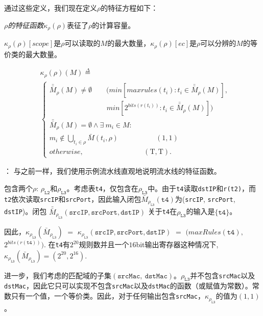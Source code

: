 通过这些定义，我们现在定义$\rho$的特征方程如下：
\begin{definition} {\em $\rho$的特征函数$\kappa_\rho(\rho)$}表征了$\rho$的计算容量。

$\kappa_\rho(\rho)[scope]$是$\rho$可以读取的$M$的最大数量，$\kappa_\rho(\rho)[ec]$是$\rho$可以分辨的$M$的等价类的最大数量。

\begin{equation*}
\begin{split}
&\kappa_\rho(\rho)(M) \overset{\Delta}{=}\\
&\begin{cases}
\bar{\bar{M}}_\rho(M) \neq \emptyset \quad \quad (min[maxrules(t_i) : t_i \in \bar{\bar{M}}_\rho(M)],\\
\quad \quad \quad \quad \quad \quad \quad \quad  min[2^{bits(r(t_i))} : t_i \in \bar{\bar{M}}_\rho(M)])\\
\bar{\bar{M}}_\rho(M) = \emptyset \wedge \exists\ m_i \in M :\\
m_i \notin \bigcup_{t_i \in \rho} \bar{M}(t_i, \rho)\  \quad \quad \quad \quad \quad (1, 1)\\
otherwise, \quad \quad \quad \quad \quad \quad \quad \ \ \ \ \, \, \,  (\mathrm{T}, \mathrm{T}). %
\end{cases}
\end{split}
\end{equation*}
\end{definition}

： 与之前一样，我们使用示例流水线\exampledp 直观地说明流水线的特征函数。

\exampledp{}包含两个$\rho$: $\rho_{\texttt{L2}}$和$\rho_{\texttt{L3}}$。考虑表\texttt{t4}，仅包含在$\rho_{\texttt{L3}}$中。由于\texttt{t4}读取\texttt{dstIP}和\texttt{r(t2)}，而\texttt{t2}依次读取\texttt{srcIP}和\texttt{srcPort}，因此输入闭包$\bar{M}_{\rho_{\texttt{L3}}}(\texttt{t4})$为(\texttt{srcIP}, \texttt{srcPort}, \texttt{dstIP})。闭包 $\bar{\bar{M}}_{\rho_\texttt{L3}}(\texttt{srcIP}, \texttt{srcPort}, \texttt{dstIP})$ 关于\texttt{t4}在$\rho_{\texttt{L3}}$的输入是$\{\texttt{t4}\}$。


因此，$\kappa_{\rho_{\texttt{L3}}}(\bar{M}_{\rho_{\texttt{L3}}})$ $=$ $\kappa_{\rho_{\texttt{L3}}}(\texttt{srcIP}, \texttt{srcPort}, \texttt{dstIP})$ $=$ $(maxRules(\texttt{t4}),$ $2^{bits(r(\texttt{t4}))})$. 在\texttt{t4}有$2^{20}$规则数并且一个$16$bit输出寄存器这种情况下, $\kappa_{\rho_{\texttt{L3}}}(\bar{M}_{\rho_{\texttt{L3}}}) = (2^{20}, 2^{16})$.

进一步，我们考虑\exampledp{}的匹配域的子集$(\texttt{srcMac},\ \texttt{dstMac})$。$\rho_{\texttt{L3}}$并不包含\texttt{srcMac}以及\texttt{dstMac}，因此它只可以实现不包含\texttt{srcMac}以及\texttt{dstMac}的函数（或赋值为常数）。常数只有一个值，一个等价类。因此，对于任何输出包含\texttt{srcMac}，$\kappa_{\rho_{\texttt{L3}}}$的值为$(1, 1)$。


